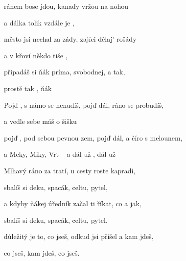 

\zs
{} ránem bose jdou, kanady vržou na nohou

a dálka tolik vzdále je ,

město jsi nechal za zády, zajíci dělaj' rošády

a v křoví někdo tiše  ,

 připadáš si ňák príma, svobodnej, a tak,

prostě  tak , ňák 
\ks

\zr
Pojď , s námo se nenudíš, pojď dál, ráno se probudíš,

a vedle sebe máš o šišku 

pojď , pod sebou pevnou zem, pojď dál, a číro s melounem,

a Meky, Miky, Vrt -- a dál už , dál už 
\kr

\zs
Mlhavý ráno za tratí, u cesty roste kapradí,

sbalíš si deku, spacák, celtu, pytel,

a kdyby ňákej úředník začal ti říkat, co a jak,

sbalíš si deku, spacák, celtu, pytel,

důležitý je to, co jseš, odkud jsi přišel a kam jdeš,

co jseš, kam jdeš, co jseš.
\ks

\zr  \kr

\kp









































